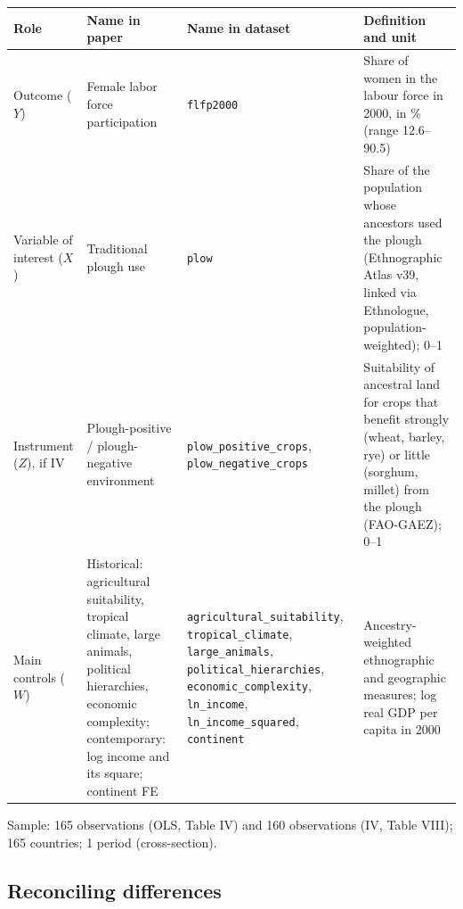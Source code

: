 \documentclass[12pt,a4paper]{article}
\renewcommand{\arraystretch}{1.25}
\begin{document}
{\renewcommand{\arraystretch}{1.4}%
\begin{tabularx}{\textwidth}{@{}>{\raggedright\arraybackslash}p{}
  >{\raggedright\arraybackslash}p{}
>{\raggedright\arraybackslash}p{}
  L@{}}
\toprule
Role & Name in paper & Name in dataset & Definition and unit \\
\midrule
Outcome ($Y$) & Female labor force participation & \texttt{flfp2000} & Share of women in the labour force in 2000, in \% (range 12.6--90.5) \\
Variable of interest ($X$) & Traditional plough use & \texttt{plow} & Share of the population whose ancestors used the plough (Ethnographic Atlas v39, linked via Ethnologue, population-weighted); 0--1 \\
Instrument ($Z$), if IV & Plough-positive / plough-negative environment & \texttt{plow\_\allowbreak positive\_\allowbreak crops}, \texttt{plow\_\allowbreak negative\_\allowbreak crops} & Suitability of ancestral land for crops that benefit strongly (wheat, barley, rye) or little (sorghum, millet) from the plough (FAO-GAEZ); 0--1 \\
Main controls ($W$) & Historical: agricultural suitability, tropical climate, large animals, political hierarchies, economic complexity; contemporary: log income and its square; continent FE & \texttt{agricultural\_\allowbreak suitability}, \texttt{tropical\_\allowbreak climate}, \texttt{large\_\allowbreak animals}, \texttt{political\_\allowbreak hierarchies}, \texttt{economic\_\allowbreak complexity}, \texttt{ln\_\allowbreak income}, \texttt{ln\_\allowbreak income\_\allowbreak squared}, \texttt{continent} & Ancestry-weighted ethnographic and geographic measures; log real GDP per capita in 2000 \\
\bottomrule
\end{tabularx}}

\medskip\noindent
Sample: 165 observations (OLS, Table IV) and 160 observations (IV, Table VIII); 165 countries; 1 period (cross-section).

\subsection{Reconciling differences}
\end{document}
